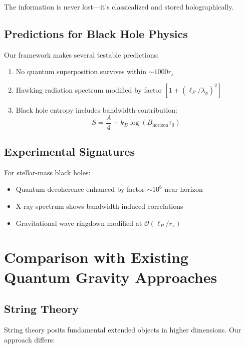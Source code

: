 \documentclass[twocolumn,prd,amsmath,amssymb,aps,superscriptaddress,nofootinbib]{revtex4-2}
\begin{document}
The information is never lost---it's classicalized and stored holographically.

\subsection{Predictions for Black Hole Physics}

Our framework makes several testable predictions:

\begin{enumerate}
\item No quantum superposition survives within $\sim 1000 r_s$
\item Hawking radiation spectrum modified by factor $[1 + (\ell_P/\lambda_\phi)^2]$
\item Black hole entropy includes bandwidth contribution: 
\begin{equation}
S = \frac{A}{4} + k_B \log(B_{\text{horizon}} \tau_0)
\end{equation}
\end{enumerate}

\subsection{Experimental Signatures}

For stellar-mass black holes:
\begin{itemize}
\item Quantum decoherence enhanced by factor $\sim 10^6$ near horizon
\item X-ray spectrum shows bandwidth-induced correlations
\item Gravitational wave ringdown modified at $\mathcal{O}(\ell_P/r_s)$
\end{itemize}

\section{Comparison with Existing Quantum Gravity Approaches}
\label{sec:comparison}

\subsection{String Theory}

String theory posits fundamental extended objects in higher dimensions. Our approach differs:
\end{document}
